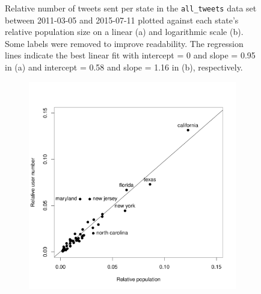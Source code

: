 \documentclass[11pt, a4paper,twoside]{report}\usepackage[]{graphicx}\usepackage[]{color}
\begin{document}
\begin{figure}[htbp!]
\caption{Relative number of tweets sent per state in the \texttt{all\_tweets} data set between 2011-03-05 and 2015-07-11 plotted against each state's relative population size on a linear (a) and logarithmic scale (b). Some labels were removed to improve readability. The regression lines indicate the best linear fit with intercept = 0 and slope = 0.95 in (a) and intercept = 0.58 and slope = 1.16 in (b), respectively.}
\end{figure}

\begin{figure}[htbp!]
\centering
 \begin{subfigure}[t]{0.6\textwidth}
  \includegraphics[width=1\linewidth]{18_ScatterTweetPop_user.pdf}
  \caption{}
  \label{fig:tweets_state_full_scatter_user}
  \end{subfigure}
  

\end{figure}
\end{document}
